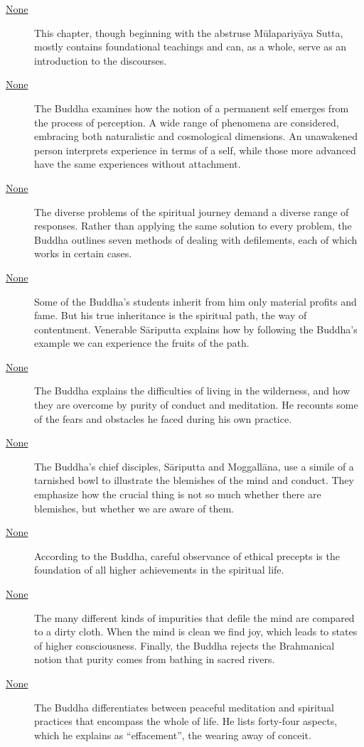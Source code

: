 \documentclass[12pt,openany]{book}%
\begin{document}
\begin{description}%
\item[\href{\#mn{-}mulapariyayavagga}{None}] This chapter, though beginning with the abstruse \textsanskrit{Mūlapariyāya} Sutta, mostly contains foundational teachings and can, as a whole, serve as an introduction to the discourses.%
\item[\href{\#mn1}{None}] The Buddha examines how the notion of a permanent self emerges from the process of perception. A wide range of phenomena are considered, embracing both naturalistic and cosmological dimensions. An unawakened person interprets experience in terms of a self, while those more advanced have the same experiences without attachment.%
\item[\href{\#mn2}{None}] The diverse problems of the spiritual journey demand a diverse range of responses. Rather than applying the same solution to every problem, the Buddha outlines seven methods of dealing with defilements, each of which works in certain cases.%
\item[\href{\#mn3}{None}] Some of the Buddha’s students inherit from him only material profits and fame. But his true inheritance is the spiritual path, the way of contentment. Venerable \textsanskrit{Sāriputta} explains how by following the Buddha’s example we can experience the fruits of the path.%
\item[\href{\#mn4}{None}] The Buddha explains the difficulties of living in the wilderness, and how they are overcome by purity of conduct and meditation. He recounts some of the fears and obstacles he faced during his own practice.%
\item[\href{\#mn5}{None}] The Buddha’s chief disciples, \textsanskrit{Sāriputta} and \textsanskrit{Moggallāna}, use a simile of a tarnished bowl to illustrate the blemishes of the mind and conduct. They emphasize how the crucial thing is not so much whether there are blemishes, but whether we are aware of them.%
\item[\href{\#mn6}{None}] According to the Buddha, careful observance of ethical precepts is the foundation of all higher achievements in the spiritual life.%
\item[\href{\#mn7}{None}] The many different kinds of impurities that defile the mind are compared to a dirty cloth. When the mind is clean we find joy, which leads to states of higher consciousness. Finally, the Buddha rejects the Brahmanical notion that purity comes from bathing in sacred rivers.%
\item[\href{\#mn8}{None}] The Buddha differentiates between peaceful meditation and spiritual practices that encompass the whole of life. He lists forty-four aspects, which he explains as “effacement”, the wearing away of conceit.%

\end{description}
\end{document}
